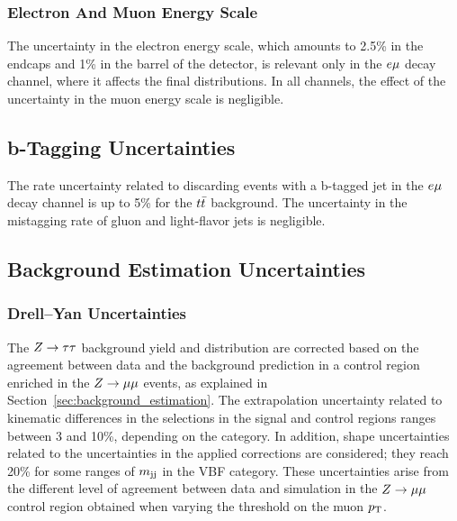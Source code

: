 \subsubsection{Electron And Muon Energy Scale}
The uncertainty in the electron energy scale, which amounts to 2.5\% in the endcaps and 1\% in the barrel of the detector, 
is relevant only in the $e\mu$ decay channel, where it affects the final distributions.
In all channels, the effect of the uncertainty in the muon energy scale is negligible.


\subsection{b-Tagging Uncertainties}
The rate uncertainty related to discarding events with a b-tagged jet in the $e\mu$ decay channel is up to
5\% for the $t\bar{t}$ background. The uncertainty in the mistagging rate of gluon and light-flavor jets is negligible.





\subsection{Background Estimation Uncertainties}
\subsubsection{Drell--Yan Uncertainties}
The $Z\to\tau\tau$ background yield and distribution are corrected based on the agreement between data and the 
background prediction in a control region enriched in the $Z\to\mu\mu$ events, as explained in 
Section~\ref{sec:background_estimation}. The extrapolation uncertainty related to kinematic differences in the selections 
in the signal and control regions ranges between 3 and 10\%, depending
on the category. In addition, shape uncertainties related to the uncertainties in the applied corrections are considered; 
they reach 20\% for some ranges of $m_\mathrm{jj}$ in the VBF category. These uncertainties arise from the different level of 
agreement between data and simulation in the $Z\to\mu\mu$ control region obtained when varying the threshold on the muon $p_\mathrm{T}$.


